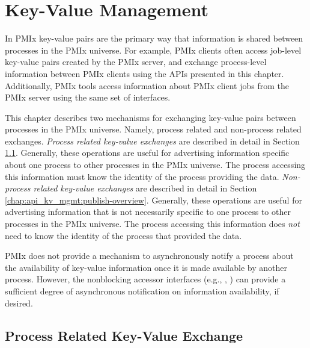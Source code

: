 \chapter{Key-Value Management}
\label{chap:api_kv_mgmt}

In \ac{PMIx} key-value pairs are the primary way that information is shared between processes in the \ac{PMIx} universe.
For example, \ac{PMIx} clients often access job-level key-value pairs created by the \ac{PMIx} server, and exchange
process-level information between \ac{PMIx} clients using the APIs presented in this chapter.
Additionally, \ac{PMIx} tools access information about \ac{PMIx} client jobs from the \ac{PMIx} server using the
same set of interfaces.

This chapter describes two mechanisms for exchanging key-value pairs between processes in the \ac{PMIx} universe.
Namely, process related and non-process related exchanges.
\emph{Process related key-value exchanges} are described in detail in Section \ref{chap:api_kv_mgmt:putget-overview}.
Generally, these operations are useful for advertising information specific about one process to other processes in the \ac{PMIx} universe.
The process accessing this information must know the identity of the process providing the data.
\emph{Non-process related key-value exchanges} are described in detail in Section \ref{chap:api_kv_mgmt:publish-overview}.
Generally, these operations are useful for advertising information that is not necessarily specific to one process to other processes in the \ac{PMIx} universe.
The process accessing this information does \emph{not} need to know the identity of the process that provided the data.

\ac{PMIx} does not provide a mechanism to asynchronously notify a process about the availability of key-value information once it is made available by another process.
However, the nonblocking accessor interfaces (e.g., , ) can provide a sufficient degree of asynchronous notification on information availability, if desired.


\section{Process Related Key-Value Exchange}
\label{chap:api_kv_mgmt:putget-overview}

